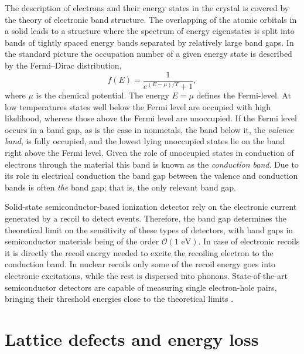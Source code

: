 The description of electrons and their energy states in the crystal is covered by the theory of electronic band structure. The overlapping of the atomic orbitals in a solid leads to a structure where the spectrum of energy eigenstates is split into bands of tightly spaced energy bands separated by relatively large band gaps. In the standard picture the occupation number of a given energy state is described by the Fermi--Dirac distribution,
\begin{equation}
    f(E)=\frac{1}{e^{(E-\mu)/T}+1},
\end{equation}
where $\mu$ is the chemical potential. The energy $E=\mu$ defines the Fermi-level. At low temperatures states well below the Fermi level are occupied with high likelihood, whereas those above the Fermi level are unoccupied. If the Fermi level occurs in a band gap, as is the case in nonmetals, the band below it, the \emph{valence band}, is fully occupied, and the lowest lying unoccupied states lie on the band right above the Fermi level. Given the role of unoccupied states in conduction of electrons through the material this band is known as the \emph{conduction band}. Due to its role in electrical conduction the band gap between the valence and conduction bands is often \emph{the} band gap; that is, the only relevant band gap.

Solid-state semiconductor-based ionization detector rely on the electronic current generated by a recoil to detect events. Therefore, the band gap determines the theoretical limit on the sensitivity of these types of detectors, with band gaps in semiconductor materials being of the order $\mathcal{O}(1\text{ eV})$. In case of electronic recoils it is directly the recoil energy needed to excite the recoiling electron to the conduction band. In nuclear recoils only some of the recoil energy goes into electronic excitations, while the rest is dispersed into phonons. State-of-the-art semiconductor detectors are capable of measuring single electron-hole pairs, bringing their threshold energies close to the theoretical limits \parencites{RomaniEtAl2018, CrislerEtAl2018, EDELWEISS2020}.

\section{Lattice defects and energy loss}

